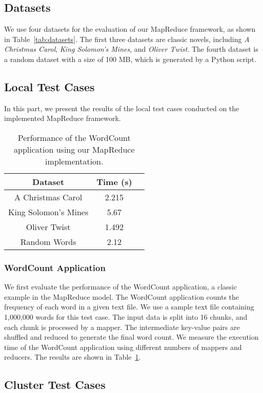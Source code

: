 \subsection{Datasets}
\label{subsec:datasets}

We use four datasets for the evaluation of our MapReduce framework, as shown in Table~\ref{tab:datasets}. The first three datasets are classic novels, including \textit{A Christmas Carol}, \textit{King Solomon's Mines}, and \textit{Oliver Twist}. The fourth dataset is a random dataset with a size of 100 MB, which is generated by a Python script.

\subsection{Local Test Cases}
\label{subsec:local-test-cases}

In this part, we present the results of the local test cases conducted on the implemented MapReduce framework. 

\begin{table}[!t]
    \centering
    \caption{Performance of the WordCount application using our MapReduce implementation.}
    \label{tab:wordcount}
    \begin{tabular}{|c|c|c|}
        \hline
        \textbf{Dataset} & \textbf{Time (s)} \\
        \hline
        A Christmas Carol & 2.215 \\
        King Solomon's Mines & 5.67 \\
        Oliver Twist & 1.492 \\
        Random Words & 2.12 \\
        \hline
    \end{tabular}
\end{table}

\subsubsection{WordCount Application}

We first evaluate the performance of the WordCount application, a classic example in the MapReduce model. The WordCount application counts the frequency of each word in a given text file. We use a sample text file containing 1,000,000 words for this test case. The input data is split into 16 chunks, and each chunk is processed by a mapper. The intermediate key-value pairs are shuffled and reduced to generate the final word count. We measure the execution time of the WordCount application using different numbers of mappers and reducers. The results are shown in Table~\ref{tab:wordcount}.

\subsection{Cluster Test Cases}
\label{subsec:cluster-test-cases}